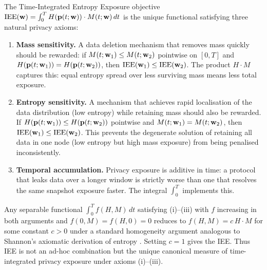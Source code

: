 
\begin{remark}
\label{rem:iee_axiomatic}
The Time-Integrated Entropy Exposure objective $\mathrm{IEE}(\mathbf{w}) = \int_0^T
H(\mathbf{p}(t;\mathbf{w}))\cdot M(t;\mathbf{w})\,dt$ is the unique functional
satisfying three natural privacy axioms:

\begin{enumerate}[label=(\roman*)]
  \item \textbf{Mass sensitivity.}  A data deletion mechanism that removes
    mass quickly should be rewarded: if $M(t;\mathbf{w}_1) \le M(t;\mathbf{w}_2)$
    pointwise on $[0,T]$ and $H(\mathbf{p}(t;\mathbf{w}_1)) = H(\mathbf{p}(t;\mathbf{w}_2))$,
    then $\mathrm{IEE}(\mathbf{w}_1) \le \mathrm{IEE}(\mathbf{w}_2)$.
    The product $H \cdot M$ captures this: equal entropy spread over less
    surviving mass means less total exposure.

  \item \textbf{Entropy sensitivity.}  A mechanism that achieves rapid
    localisation of the data distribution (low entropy) while retaining
    mass should also be rewarded.  If $H(\mathbf{p}(t;\mathbf{w}_1)) \le
    H(\mathbf{p}(t;\mathbf{w}_2))$ pointwise and $M(t;\mathbf{w}_1) = M(t;\mathbf{w}_2)$,
    then $\mathrm{IEE}(\mathbf{w}_1) \le \mathrm{IEE}(\mathbf{w}_2)$.
    This prevents the degenerate solution of retaining all data in one node
    (low entropy but high mass exposure) from being penalised inconsistently.

  \item \textbf{Temporal accumulation.}  Privacy exposure is additive in
    time: a protocol that leaks data over a longer window is strictly worse
    than one that resolves the same snapshot exposure faster.  The integral
    $\int_0^T$ implements this.
\end{enumerate}

Any separable functional $\int_0^T f(H, M)\,dt$ satisfying (i)--(iii) with
$f$ increasing in both arguments and $f(0,M) = f(H,0) = 0$ reduces to
$f(H,M) = c\,H\cdot M$ for some constant $c > 0$ under a standard
homogeneity argument analogous to Shannon's axiomatic derivation of
entropy \cite{jaynes1957information}.  Setting $c=1$ gives the IEE.  Thus IEE is not
an ad-hoc combination but the unique canonical measure of time-integrated
privacy exposure under axioms (i)--(iii).
\end{remark}
